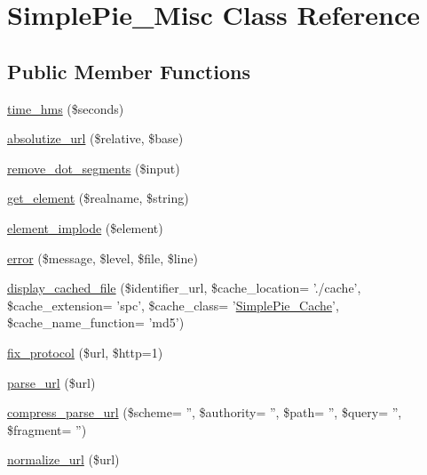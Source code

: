 \hypertarget{class_simple_pie___misc}{\section{Simple\-Pie\-\_\-\-Misc Class Reference}
\label{class_simple_pie___misc}
}
\subsection*{Public Member Functions}
\begin{DoxyCompactItemize}
\item 
\hyperlink{class_simple_pie___misc_a607a9477321d8b2620a070c265d61296}{time\-\_\-hms} (\$seconds)
\item 
\hyperlink{class_simple_pie___misc_a8915c434038e37a4af8c00fe458030d4}{absolutize\-\_\-url} (\$relative, \$base)
\item 
\hyperlink{class_simple_pie___misc_ab8866c0a683a00c4510d359b4518ceb7}{remove\-\_\-dot\-\_\-segments} (\$input)
\item 
\hyperlink{class_simple_pie___misc_a38c8f7a67af4e46e031133be423a4dbc}{get\-\_\-element} (\$realname, \$string)
\item 
\hyperlink{class_simple_pie___misc_a084581ddf19af314d3e4646f554113bb}{element\-\_\-implode} (\$element)
\item 
\hyperlink{class_simple_pie___misc_aa6b90c87a15e5e1b9d9049abf2bf34c1}{error} (\$message, \$level, \$file, \$line)
\item 
\hyperlink{class_simple_pie___misc_a945d508482a0bb6584460193b45d5ecc}{display\-\_\-cached\-\_\-file} (\$identifier\-\_\-url, \$cache\-\_\-location= './cache', \$cache\-\_\-extension= 'spc', \$cache\-\_\-class= '\hyperlink{class_simple_pie___cache}{Simple\-Pie\-\_\-\-Cache}', \$cache\-\_\-name\-\_\-function= 'md5')
\item 
\hyperlink{class_simple_pie___misc_ae66a4ee0d75a75688f3d53d427313e36}{fix\-\_\-protocol} (\$url, \$http=1)
\item 
\hyperlink{class_simple_pie___misc_aca98d83dad949ab5ef854cda5e19708b}{parse\-\_\-url} (\$url)
\item 
\hyperlink{class_simple_pie___misc_a3c7632372512f4370a0be49f94ebc33b}{compress\-\_\-parse\-\_\-url} (\$scheme= '', \$authority= '', \$path= '', \$query= '', \$fragment= '')
\item 
\hyperlink{class_simple_pie___misc_ad2f74f067ac41aa71e5a9f2adc8f826c}{normalize\-\_\-url} (\$url)
\item 

\end{DoxyCompactItemize}
